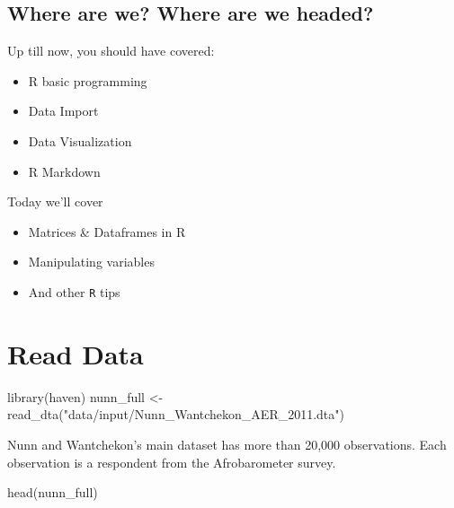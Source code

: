 \documentclass[
  letterpaper,
]{book}
\newenvironment{Shaded}{\begin{snugshade}}{\end{snugshade}}
\newcommand{\FunctionTok}[1]{\textcolor[rgb]{0.28,0.35,0.67}{#1}}
\newcommand{\NormalTok}[1]{\textcolor[rgb]{0.00,0.23,0.31}{#1}}
\newcommand{\OtherTok}[1]{\textcolor[rgb]{0.00,0.23,0.31}{#1}}
\newcommand{\StringTok}[1]{\textcolor[rgb]{0.13,0.47,0.30}{#1}}
\providecommand{\tightlist}{%
  \setlength{\itemsep}{0pt}\setlength{\parskip}{0pt}}\usepackage{longtable,booktabs,array}
\theoremstyle{definition}
\theoremstyle{definition}
\theoremstyle{plain}
\theoremstyle{definition}
\theoremstyle{plain}
\theoremstyle{plain}
\theoremstyle{remark}
\begin{document}
\hypertarget{where-are-we-where-are-we-headed-3}{%
\subsection*{Where are we? Where are we
headed?}\label{where-are-we-where-are-we-headed-3}}

Up till now, you should have covered:

\begin{itemize}
\tightlist
\item
  R basic programming
\item
  Data Import
\item
  Data Visualization
\item
  R Markdown
\end{itemize}

Today we'll cover

\begin{itemize}
\tightlist
\item
  Matrices \& Dataframes in R
\item
  Manipulating variables
\item
  And other \texttt{R} tips
\end{itemize}

\hypertarget{read-data}{%
\section{Read Data}\label{read-data}}

\begin{Shaded}
\begin{Highlighting}[]
\FunctionTok{library}\NormalTok{(haven)}
\NormalTok{nunn\_full }\OtherTok{\textless{}{-}} \FunctionTok{read\_dta}\NormalTok{(}\StringTok{"data/input/Nunn\_Wantchekon\_AER\_2011.dta"}\NormalTok{)}
\end{Highlighting}
\end{Shaded}

Nunn and Wantchekon's main dataset has more than 20,000 observations.
Each observation is a respondent from the Afrobarometer survey.

\begin{Shaded}
\begin{Highlighting}[]
\FunctionTok{head}\NormalTok{(nunn\_full)}
\end{Highlighting}
\end{Shaded}
\end{document}
